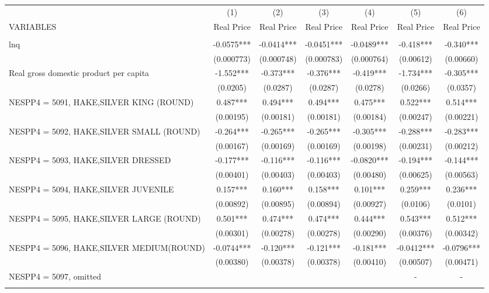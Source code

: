 \begin{tabular}{lcccccc} \hline
 & (1) & (2) & (3) & (4) & (5) & (6) \\
VARIABLES & Real Price & Real Price & Real Price & Real Price & Real Price & Real Price \\ \hline
 &  &  &  &  &  &  \\
lnq & -0.0575*** & -0.0414*** & -0.0451*** & -0.0489*** & -0.418*** & -0.340*** \\
 & (0.000773) & (0.000748) & (0.000783) & (0.000764) & (0.00612) & (0.00660) \\
Real gross domestic product per capita & -1.552*** & -0.373*** & -0.376*** & -0.419*** & -1.734*** & -0.305*** \\
 & (0.0205) & (0.0287) & (0.0287) & (0.0278) & (0.0266) & (0.0357) \\
NESPP4 = 5091, HAKE,SILVER KING (ROUND) & 0.487*** & 0.494*** & 0.494*** & 0.475*** & 0.522*** & 0.514*** \\
 & (0.00195) & (0.00181) & (0.00181) & (0.00184) & (0.00247) & (0.00221) \\
NESPP4 = 5092, HAKE,SILVER SMALL (ROUND) & -0.264*** & -0.265*** & -0.265*** & -0.305*** & -0.288*** & -0.283*** \\
 & (0.00167) & (0.00169) & (0.00169) & (0.00198) & (0.00231) & (0.00212) \\
NESPP4 = 5093, HAKE,SILVER DRESSED & -0.177*** & -0.116*** & -0.116*** & -0.0820*** & -0.194*** & -0.144*** \\
 & (0.00401) & (0.00403) & (0.00403) & (0.00480) & (0.00625) & (0.00563) \\
NESPP4 = 5094, HAKE,SILVER JUVENILE & 0.157*** & 0.160*** & 0.158*** & 0.101*** & 0.259*** & 0.236*** \\
 & (0.00892) & (0.00895) & (0.00894) & (0.00927) & (0.0106) & (0.0101) \\
NESPP4 = 5095, HAKE,SILVER LARGE (ROUND) & 0.501*** & 0.474*** & 0.474*** & 0.444*** & 0.543*** & 0.512*** \\
 & (0.00301) & (0.00278) & (0.00278) & (0.00290) & (0.00376) & (0.00342) \\
NESPP4 = 5096, HAKE,SILVER MEDIUM(ROUND) & -0.0744*** & -0.120*** & -0.121*** & -0.181*** & -0.0412*** & -0.0796*** \\
 & (0.00380) & (0.00378) & (0.00378) & (0.00410) & (0.00507) & (0.00471) \\
NESPP4 = 5097, omitted &  &  &  &  & - & - \\
 &  &  &  &  &  &  \\

\end{tabular}
